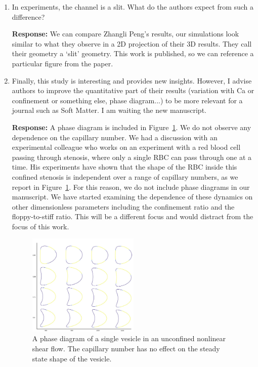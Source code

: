 \documentclass[11pt]{article}
\begin{document}
\begin{enumerate}
\item In experiments, the channel is a slit. What do the authors expect
  from such a difference?

\noindent
{\bf Response:} We can compare Zhangli Peng's results, our simulations
look similar to what they observe in a 2D projection of their 3D
results. They call their geometry a `slit' geometry. This work is
published, so we can reference a particular figure from the paper.

\item Finally, this study is interesting and provides new insights.
  However, I advise authors to improve the quantitative part of their
  results (variation with Ca or confinement or something else, phase
  diagram...) to be more relevant for a journal such as Soft Matter. I
  am waiting the new manuscript.

\noindent
{\bf Response:} A phase diagram is included in Figure~\ref{fig:Phase}.
We do not observe any dependence on the capillary number. We had a
discussion with an experimental colleague who works on an experiment
with a red blood cell passing through stenosis, where only a single RBC
can pass through one at a time. His experiments have shown that the
shape of the RBC inside this confined stenosis is independent over a
range of capillary numbers, as we report in Figure~\ref{fig:Phase}. For
this reason, we do not include phase diagrams in our manuscript. We have
started examining the dependence of these dynamics on other
dimensionless parameters including the confinement ratio and the
floppy-to-stiff ratio. This will be a different focus and would distract
from the focus of this work.
\begin{figure}
\centering
  \includegraphics[width=0.5\textwidth]{phaseDiagram.jpg}
  \caption{\label{fig:Phase} A phase diagram of a single vesicle in an unconfined
  nonlinear shear flow. The capillary number has no effect on the steady
  state shape of the vesicle.}
\end{figure}


\end{enumerate}
\end{document}
